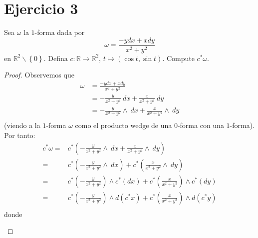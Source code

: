 \documentclass[12pt]{report}
\theoremstyle{largebreak}
\newcommand\cf[3]{\ensuremath{#1:#2\rightarrow#3}}
\begin{document}
    \newpage

    \section{Ejercicio 3}

    \begin{excer}
        Sea $\omega$ la $1$-forma dada por
        \begin{equation*}
            \omega = \frac{-ydx+xdy}{x^2+y^2}
        \end{equation*}
        en $\mathbb{R}^2\backslash\left\{0\right\}$. Defina $\cf{c}{\mathbb{R}}{\mathbb{R}^2}$, $t\mapsto (\cos t,\sin t)$. Compute $c^*\omega$.
    \end{excer}

    \begin{proof}
        Observemos que
        \begin{equation*}
            \begin{split}
                \omega&=\frac{-ydx+xdy}{x^2+y^2}\\
                &=-\frac{y}{x^2+y^2}\:dx+\frac{x}{x^2+y^2}\:dy\\
                &=-\frac{y}{x^2+y^2}\wedge\:dx+\frac{x}{x^2+y^2}\wedge\:dy\\
            \end{split}
        \end{equation*}
        (viendo a la $1$-forma $\omega$ como el producto wedge de una $0$-forma con una $1$-forma). Por tanto:
        \begin{equation*}
            \begin{split}
                c^*\omega=&c^*\left(-\frac{y}{x^2+y^2}\wedge\:dx+\frac{x}{x^2+y^2}\wedge\:dy\right) \\
                =&c^*\left(-\frac{y}{x^2+y^2}\wedge\:dx\right)+c^*\left(\frac{x}{x^2+y^2}\wedge\:dy\right) \\
                =&c^*\left(-\frac{y}{x^2+y^2}\right)\wedge c^*\left(dx\right)+c^*\left(\frac{x}{x^2+y^2}\right)\wedge c^*\left(dy\right) \\
                =&c^*\left(-\frac{y}{x^2+y^2}\right)\wedge d\left(c^*x\right)+c^*\left(\frac{x}{x^2+y^2}\right)\wedge d\left(c^*y\right) \\
            \end{split}
        \end{equation*}
        donde
        \begin{enumerate}

\end{enumerate}
\end{proof}
\end{document}
